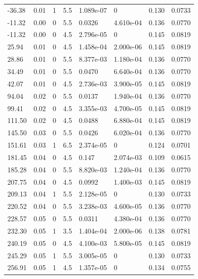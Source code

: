 \documentclass[preview]{standalone}
\begin{document}
{{\begin{tabular}{L{1.2cm}C{1.2cm} C{0.3cm}C{0.5cm} C{1.4cm}C{1.4cm} C{1.4cm}C{1.4cm}}
  -36.38  &  0.01  & 1     & 5.5 &  1.089e-07  & 0  & 0.130 &  0.0733   \\ 
  -11.32  &  0.00  & 0     & 5.5 &  0.0326  & 4.610e-04  & 0.136 &  0.0770   \\ 
  -11.32  &  0.00  & 0     & 4.5 &  2.796e-05  & 0  & 0.145 &  0.0819   \\ 
  25.94  &  0.01  & 0     & 4.5 &  1.458e-04  & 2.000e-06  & 0.145 &  0.0819   \\ 
  28.86  &  0.01  & 0     & 5.5 &  8.377e-03  & 1.180e-04  & 0.136 &  0.0770   \\ 
  34.49  &  0.01  & 0     & 5.5 &  0.0470  & 6.640e-04  & 0.136 &  0.0770   \\ 
  42.07  &  0.01  & 0     & 4.5 &  2.736e-03  & 3.900e-05  & 0.145 &  0.0819   \\ 
  94.04  &  0.02  & 0     & 5.5 &  0.0137  & 1.940e-04  & 0.136 &  0.0770   \\ 
  99.41  &  0.02  & 0     & 4.5 &  3.355e-03  & 4.700e-05  & 0.145 &  0.0819   \\ 
  111.50  &  0.02  & 0     & 4.5 &  0.0488  & 6.880e-04  & 0.145 &  0.0819   \\ 
  145.50  &  0.03  & 0     & 5.5 &  0.0426  & 6.020e-04  & 0.136 &  0.0770   \\ 
  151.61  &  0.03  & 1     & 6.5 &  2.374e-05  & 0  & 0.124 &  0.0701   \\ 
  181.45  &  0.04  & 0     & 4.5 &  0.147  & 2.074e-03  & 0.109 &  0.0615   \\ 
  185.28  &  0.04  & 0     & 5.5 &  8.820e-03  & 1.240e-04  & 0.136 &  0.0770   \\ 
  207.75  &  0.04  & 0     & 4.5 &  0.0992  & 1.400e-03  & 0.145 &  0.0819   \\ 
  209.13  &  0.04  & 1     & 5.5 &  2.128e-05  & 0  & 0.130 &  0.0733   \\ 
  220.52  &  0.04  & 0     & 5.5 &  3.238e-03  & 4.600e-05  & 0.136 &  0.0770   \\ 
  228.57  &  0.05  & 0     & 5.5 &  0.0311  & 4.380e-04  & 0.136 &  0.0770   \\ 
  232.30  &  0.05  & 1     & 3.5 &  1.404e-04  & 2.000e-06  & 0.138 &  0.0781   \\ 
  240.19  &  0.05  & 0     & 4.5 &  4.100e-03  & 5.800e-05  & 0.145 &  0.0819   \\ 
  245.29  &  0.05  & 1     & 5.5 &  3.005e-05  & 0  & 0.130 &  0.0733   \\ 
  256.91  &  0.05  & 1     & 4.5 &  1.357e-05  & 0  & 0.134 &  0.0755   \\ 

\end{tabular}}}
\end{document}
